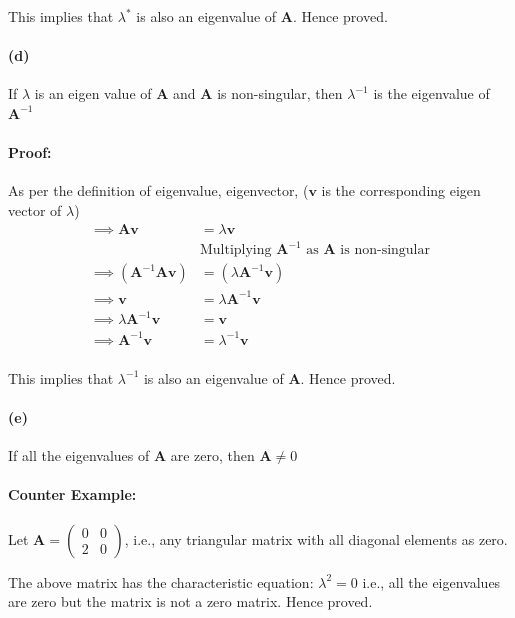 \documentclass[12pt, letterpaper]{article}
\begin{document}
This implies that $\lambda^{*}$ is also an eigenvalue of $\mathbf{A}$. Hence proved.

\paragraph{(d)} If $\lambda$ is an eigen value of $\mathbf{A}$ and $\mathbf{A}$ is non-singular, then $\lambda^{-1}$ is the eigenvalue of $\mathbf{A}^{-1}$

\paragraph{Proof:}
As per the definition of eigenvalue, eigenvector, ($\mathbf{v}$ is the corresponding eigen vector of $\lambda$)
\begin{align*}
  \implies \mathbf{A}\mathbf{v} &= \lambda \mathbf{v} \\
  &\text{Multiplying $\mathbf{A}^{-1}$ as $\mathbf{A}$ is non-singular} \\
  \implies (\mathbf{A}^{-1}\mathbf{A}\mathbf{v}) &= (\lambda \mathbf{A}^{-1}\mathbf{v}) \\
  \implies \mathbf{v} &= \lambda \mathbf{A}^{-1}\mathbf{v} \\
  \implies \lambda \mathbf{A}^{-1}\mathbf{v} &= \mathbf{v} \\
  \implies \mathbf{A}^{-1}\mathbf{v} &= \lambda^{-1} \mathbf{v} \\
\end{align*}

This implies that $\lambda^{-1}$ is also an eigenvalue of $\mathbf{A}$. Hence proved.

\paragraph{(e)} If all the eigenvalues of $\mathbf{A}$ are zero, then $\mathbf{A} \not = 0$

\paragraph{Counter Example:} Let $\mathbf{A} =
\begin{pmatrix} 0 & 0 \\ 2 & 0 \end{pmatrix}$, i.e., any triangular matrix with all diagonal elements as zero.

The above matrix has the characteristic equation: $\lambda^2 = 0$ i.e., all the eigenvalues are zero but the matrix is not a zero matrix. Hence proved.
\end{document}
